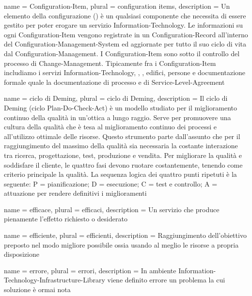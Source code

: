 %
%
{
	name		= {\acf{Configuration-Item}},
	plural		= {configuration items},
	description = {Un elemento della configurazione () è un qualsiasi componente che necessita di essere gestito per poter erogare un servizio \acs{Information-Technology}. Le informazioni su ogni \acs{Configuration-Item} vengono registrate in un \acf{Configuration-Record} all'interno del \acf{Configuration-Management-System} ed aggiornate per tutto il suo ciclo di vita dal \acf{Configuration-Management}. I \ac{Configuration-Item} sono sotto il controllo del processo di \acs{Change-Management}. Tipicamente fra i \ac{Configuration-Item} includiamo i servizi \acs{Information-Technology}, , , edifici, persone e documentazione formale quale la documentazione di processo e di \acf{Service-Level-Agreement}}
}

{
	name		= {ciclo di Deming},
	plural		= {ciclo di Deming},
	description = {Il ciclo di Deming (ciclo \acf{Plan-Do-Check-Act}) è un modello studiato per il miglioramento continuo della qualità in un'ottica a lungo raggio. Serve per promuovere una cultura della qualità che è tesa al miglioramento continuo dei processi e all'utilizzo ottimale delle risorse. Questo strumento parte dall'assunto che per il raggiungimento del massimo della qualità sia necessaria la costante interazione tra ricerca, progettazione, test, produzione e vendita. Per migliorare la qualità e soddisfare il cliente, le quattro fasi devono ruotare costantemente, tenendo come criterio principale la qualità. La sequenza logica dei quattro punti ripetuti è la seguente: P = pianificazione; D = esecuzione; C = test e controllo; A = attuazione per rendere definitivi i miglioramenti}
}

{
	name		= {efficace},
	plural		= {efficaci},
	description = {Un servizio che produce pienamente l'effetto richiesto o desiderato}
}

{
	name		= {efficiente},
	plural		= {efficienti},
	description = {Raggiungimento dell'obiettivo preposto nel modo migliore possibile ossia usando al meglio le risorse a propria disposizione}
}

{
	name		= {errore},
	plural		= {errori},
	description = {In ambiente \ac{Information-Technology-Infrastructure-Library} viene definito errore un problema la cui soluzione è ormai nota}
}

